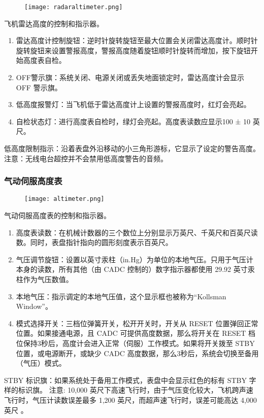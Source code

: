 \begin{figure}[htb]
  \center
  \texttt{[image: radaraltimeter.png]}
\end{figure}
飞机雷达高度的控制和指示器。

\begin{enumerate}
  \item 雷达高度计控制旋钮：逆时针旋转旋钮至最大位置会关闭雷达高度计。顺时针旋转旋钮来设置警报高度，警报高度随着旋钮顺时针旋转而增加，按下旋钮开始高度表自检。
  \item OFF警示旗：系统关闭、电源关闭或丢失地面锁定时，雷达高度计会显示 OFF 警示旗。
  \item 低高度报警灯：当飞机低于雷达高度计上设置的警报高度时，红灯会亮起。
  \item 自检状态灯：进行高度表自检时，绿灯会亮起。高度表读数应显示100 ± 10 英尺。
\end{enumerate}

低高度限制指示：沿着表盘外沿移动的小三角形游标，它显示了设定的警告高度。
注意：无线电台超控并不会禁用低高度警告的音频。

\subsubsection{气动伺服高度表}

\begin{figure}[htb]
  \center
  \texttt{[image: altimeter.png]}
\end{figure}
气动伺服高度表的控制和指示器。

\begin{enumerate}
  \item 高度表读数：在机械计数器的三个数位上分别显示万英尺、千英尺和百英尺读数。同时，表盘指针指向的圆形刻度表示百英尺。
  \item 气压调节旋钮：设置以英寸汞柱（in.Hg）为单位的本地气压。只用于气压计本身的读数，所有其他（由 CADC 控制的）数字指示器都使用 29.92 英寸汞柱作为气压数值。
  \item 本地气压：指示调定的本地气压值，这个显示框也被称为“Kollsman Window”。
  \item 模式选择开关：三档位弹簧开关，松开开关时，开关从 RESET 位置弹回正常位置。如果接通电源，且 CADC 可提供高度数据，那么将开关在 RESET 档位保持3秒后，高度计会进入正常（伺服）工作模式。如果将开关拨至 STBY 位置，或电源断开，或缺少 CADC 高度数据，那么3秒后，系统会切换至备用（气压）模式。
\end{enumerate}

STBY 标识旗：如果系统处于备用工作模式，表盘中会显示红色的标有 STBY 字样的标识旗。
注意:	10,000 英尺下高速飞行时，由于气压变化较大，飞机跨声速飞行时，气压计读数误差最多 1,200 英尺，而超声速飞行时，误差可能高达 4,000 英尺 。

